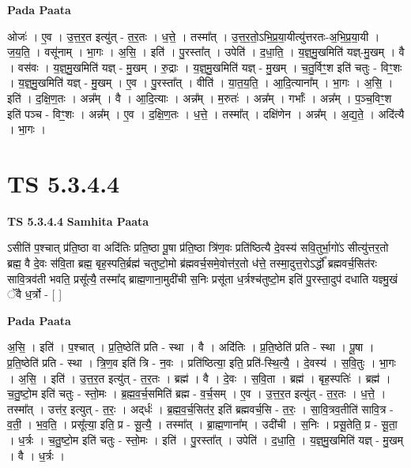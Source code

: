 \documentclass[17pt]{extarticle}
\begin{document}
\textbf{Pada Paata} \newline

ओजः॑ । ए॒व । उ॒त्त॒र॒त इत्यु॑त् - त॒र॒तः । ध॒त्ते॒ । तस्मा᳚त् । उ॒त्त॒र॒तो॒ऽभि॒प्र॒या॒यीत्यु॑त्तरतः-अ॒भि॒प्र॒या॒यी । ज॒य॒ति॒ । वसू॑नाम् । भा॒गः । अ॒सि॒ । इति॑ । पु॒रस्ता᳚त् । उपेति॑ । द॒धा॒ति॒ । य॒ज्ञ्॒मु॒खमिति॑ यज्ञ्-मु॒खम् । वै । वस॑वः । य॒ज्ञ्॒मु॒खमिति॑ यज्ञ् - मु॒खम् । रु॒द्राः । य॒ज्ञ्॒मु॒खमिति॑ यज्ञ् - मु॒खम् । च॒तु॒र्विꣳ॒॒श इति॑ चतुः - विꣳ॒॒शः । य॒ज्ञ्॒मु॒खमिति॑ यज्ञ् - मु॒खम् । ए॒व । पु॒रस्ता᳚त् । वीति॑ । या॒त॒य॒ति॒ । आ॒दि॒त्याना᳚म् । भा॒गः । अ॒सि॒ । इति॑ । द॒क्षि॒ण॒तः । अन्न᳚म् । वै । आ॒दि॒त्याः । अन्न᳚म् । म॒रुतः॑ । अन्न᳚म् । गर्भाः᳚ । अन्न᳚म् । प॒ञ्च॒विꣳ॒॒श इति॑ पञ्च - विꣳ॒॒शः । अन्न᳚म् । ए॒व । द॒क्षि॒ण॒तः । ध॒त्ते॒ । तस्मा᳚त् । दक्षि॑णेन । अन्न᳚म् । अ॒द्य॒ते॒ । अदि॑त्यै । भा॒गः ।  \newline




\section*{ TS 5.3.4.4 }

\textbf{TS 5.3.4.4 } \newline
\textbf{Samhita Paata} \newline

ऽसीति॑ प॒श्चात् प्र॑ति॒ष्ठा वा अदि॑तिः प्रति॒ष्ठा पू॒षा प्र॑ति॒ष्ठा त्रि॑ण॒वः प्रति॑ष्ठित्यै दे॒वस्य॑ सवि॒तुर्भा॒गो॑ऽ सीत्यु॑त्तर॒तो ब्रह्म॒ वै दे॒वः स॑वि॒ता ब्रह्म॒ बृह॒स्पति॒र्ब्रह्म॑ चतुष्टो॒मो ब्र॑ह्मवर्च॒समे॒वोत्त॑र॒तो ध॑त्ते॒ तस्मा॒दुत्त॒रोऽर्द्धो᳚ ब्रह्मवर्च॒सित॑रः सावि॒त्रव॑ती भवति॒ प्रसू᳚त्यै॒ तस्मा᳚द् ब्राह्म॒णाना॒मुदी॑ची स॒निः प्रसू॑ता ध॒र्त्रश्च॑तुष्टो॒म इति॑ पु॒रस्ता॒दुप॑ दधाति यज्ञ्मु॒खं ॅवै ध॒र्त्रो - [  ] \newline

\textbf{Pada Paata} \newline

अ॒सि॒ । इति॑ । प॒श्चात् । प्र॒ति॒ष्ठेति॑ प्रति - स्था । वै । अदि॑तिः । प्र॒ति॒ष्ठेति॑ प्रति - स्था । पू॒षा । प्र॒ति॒ष्ठेति॑ प्रति - स्था । त्रि॒ण॒व इति॑ त्रि - न॒वः । प्रति॑ष्ठित्या॒ इति॒ प्रति॑-स्थि॒त्यै॒ । दे॒वस्य॑ । स॒वि॒तुः । भा॒गः । अ॒सि॒ । इति॑ । उ॒त्त॒र॒त इत्यु॑त् - त॒र॒तः । ब्रह्म॑ । वै । दे॒वः । स॒वि॒ता । ब्रह्म॑ । बृह॒स्पतिः॑ । ब्रह्म॑ । च॒तु॒ष्टो॒म इति॑ चतुः - स्तो॒मः । ब्र॒ह्म॒व॒र्च॒समिति॑ ब्रह्म - व॒र्च॒सम् । ए॒व । उ॒त्त॒र॒त इत्यु॑त् - त॒र॒तः । ध॒त्ते॒ । तस्मा᳚त् । उत्त॑र॒ इत्युत् - त॒रः॒ । अद्‌र्धः॑ । ब्र॒ह्म॒व॒र्च॒सित॑र॒ इति॑ ब्रह्मवर्च॒सि - त॒रः॒ । सा॒वि॒त्रव॒तीति॑ सावि॒त्र - व॒ती॒ । भ॒व॒ति॒ । प्रसू᳚त्या॒ इति॒ प्र - सू॒त्यै॒ । तस्मा᳚त् । ब्रा॒ह्म॒णाना᳚म् । उदी॑ची । स॒निः । प्रसू॒तेति॒ प्र - सू॒ता॒ । ध॒र्त्रः । च॒तु॒ष्टो॒म इति॑ चतुः - स्तो॒मः । इति॑ । पु॒रस्ता᳚त् । उपेति॑ । द॒धा॒ति॒ । य॒ज्ञ्॒मु॒खमिति॑ यज्ञ् - मु॒खम् । वै । ध॒र्त्रः ।  \newline
\end{document}
